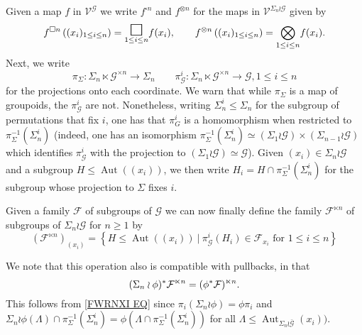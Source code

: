 \documentclass[a4paper,10pt
,draft
]{article}%
\numberwithin{equation}{section}
\numberwithin{figure}{section}
\theoremstyle{definition} %
\DeclareMathOperator{\Aut}{Aut}%
\newcommand{\F}{\ensuremath{\mathcal F}}
\newcommand{\G}{\ensuremath{\mathcal G}}
\newcommand{\1}{\ensuremath{\mathbbm 1}}%
\begin{document}
Given a map $f$ in $\mathcal{V}^{\G}$
we write 
$f^{\square n}$  and 
$f^{\otimes n}$
for the maps in $\mathcal{V}^{\Sigma_n \wr \G}$
given by
\begin{equation}\label{FSQNDEF EQ}
f^{\square n}\left((x_i)_{1\leq i \leq n }\right)
=
\underset{1\leq i \leq n}{\mathlarger{\mathlarger{\mathlarger{\square}}}} f(x_i),
\qquad
f^{\otimes n}\left((x_i)_{1\leq i \leq n }\right)
=
\underset{1\leq i \leq n}{\bigotimes} f(x_i).
\end{equation}
Next, we write
\[
\pi_{\Sigma} \colon \Sigma_n \ltimes \G^{\times n} \to \Sigma_n
\qquad
\pi^i_{\G} \colon \Sigma_n \ltimes \G^{\times n} \to \G, 1\leq i \leq n
\]
for the projections onto each coordinate.
We warn that while $\pi_{\Sigma}$ is a map of groupoids, 
the $\pi^i_{\G}$ are not.
Nonetheless, writing $\Sigma^i_n \leq \Sigma_n$
for the subgroup of permutations that fix $i$, 
one has that $\pi_{G}^i$ is a homomorphism when restricted to 
$\pi^{-1}_{\Sigma}(\Sigma_n^i)$ 
(indeed, one has an isomorphism 
$\pi^{-1}_{\Sigma}(\Sigma_n^i) \simeq 
(\Sigma_{1} \wr \G) \times (\Sigma_{n-1} \wr \G)$
which identifies $\pi_{\G}^i$ with the projection to 
$(\Sigma_{1} \wr \G) \simeq \G$).
Given $(x_i) \in \Sigma_n \wr \G$
and a subgroup
$H \leq \Aut((x_i))$,
we then write
$H_i = H \cap \pi^{-1}_{\Sigma}(\Sigma_n^i)$
for the subgroup whose projection to $\Sigma$ fixes $i$.

Given a family $\F$ of subgroups of $\G$
we can now finally define the family $\F^{\ltimes n}$
of subgroups of $\Sigma_n \wr \G$ for $n\geq 1$ by
\begin{equation}\label{FWRNXI EQ}
\left(\F^{\ltimes n}\right)_{(x_i)}
=
\left\{
      H \leq \Aut((x_i))
      \ | \
      \pi^i_{\G}(H_i) \in \F_{x_i} \text{ for } 1 \leq i \leq n
\right\}
\end{equation}

We note that this operation also is compatible with pullbacks, in that 
\begin{equation}
      \label{PHIFLTIMES_EQ}
      (\Sigma_n \wr \phi)^{\**}\F^{\ltimes n} = (\phi^{\**} \F)^{\ltimes n}.
\end{equation}
This follows from \eqref{FWRNXI EQ} since
$\pi_i (\Sigma_n \wr \phi) = \phi \pi_i$ and
$\Sigma_n \wr \phi(\Lambda) \cap \pi_{\Sigma}^{-1}(\Sigma_n^i) = \phi(\Lambda \cap \pi_{\Sigma}^{-1}(\Sigma_n^i))$
for all $\Lambda \leq \Aut_{\Sigma_n \wr \bar{\mathcal G}}(x_i))$.
\end{document}
